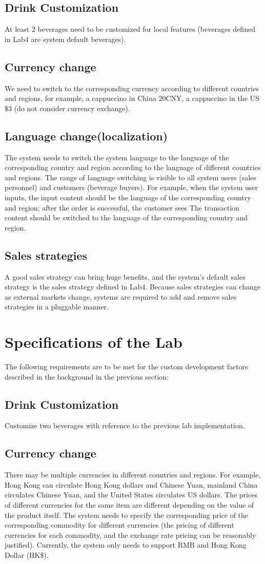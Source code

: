 \documentclass[a4paper]{report}
\begin{document}
\subsection{Drink Customization}
At least 2 beverages need to be customized for local features (beverages defined in Lab4 are system default beverages).
\subsection{Currency change}
We need to switch to the corresponding currency according to different countries and regions, for example, a cappuccino in China 20CNY, a cappuccino in the US \$3 (do not consider currency exchange).
\subsection{Language change(localization)}
The system needs to switch the system language to the language of the corresponding country and region according to the language of different countries and regions. The range of language switching is visible to all system users (sales personnel) and customers (beverage buyers). For example, when the system user inputs, the input content should be the language of the corresponding country and region; after the order is successful, the customer sees The transaction content should be switched to the language of the corresponding country and region.
\subsection{Sales strategies}
A good sales strategy can bring huge benefits, and the system's default sales strategy is the sales strategy defined in Lab4. Because sales strategies can change as external markets change, systems are required to add and remove sales strategies in a pluggable manner.

\section{Specifications of the Lab}
The following requirements are to be met for the custom development factors described in the background in the previous section:
\subsection{Drink Customization}
Customize two beverages with reference to the previous lab implementation.
\subsection{Currency change}
There may be multiple currencies in different countries and regions. For example, Hong Kong can circulate Hong Kong dollars and Chinese Yuan, mainland China circulates Chinese Yuan, and the United States circulates US dollars. The prices of different currencies for the same item are different depending on the value of the product itself. The system needs to specify the corresponding price of the corresponding commodity for different currencies (the pricing of different currencies for each commodity, and the exchange rate pricing can be reasonably justified). Currently, the system only needs to support RMB and Hong Kong Dollar (HK\$).
\end{document}
